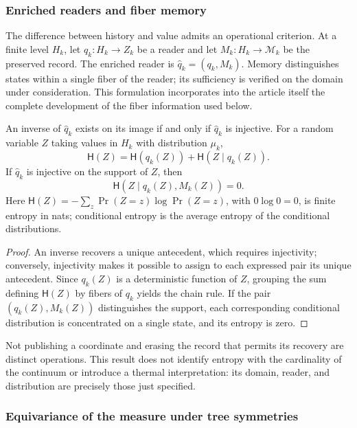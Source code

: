 \subsubsection{Enriched readers and fiber memory}
\label{act21:sec:ch-memoria-fibra}

The difference between history and value admits an operational criterion. At a
finite level \(H_k\), let \(q_k:H_k\to Z_k\) be a reader and let
\(M_k:H_k\to\mathcal M_k\) be the preserved record. The enriched reader
is \(\widehat q_k=(q_k,M_k)\). Memory distinguishes states within a single
fiber of the reader; its sufficiency is verified on the domain under consideration.
This formulation incorporates into the article itself the complete development of the
fiber information used below.

\begin{proposition}
\label{act21:prop:ch-recuperabilidad-fibra}
An inverse of \(\widehat q_k\) exists on its image if and only if
\(\widehat q_k\) is injective. For a random variable \(Z\) taking
values in \(H_k\) with distribution \(\mu_k\),
\[
 \mathsf H(Z)=\mathsf H(q_k(Z))+\mathsf H(Z\mid q_k(Z)).
\]
If \(\widehat q_k\) is injective on the support of \(Z\), then
\[
 \mathsf H(Z\mid q_k(Z),M_k(Z))=0.
\]
Here \(\mathsf H(Z)=-\sum_z\Pr(Z=z)\log\Pr(Z=z)\), with
\(0\log0=0\), is finite entropy in nats; conditional entropy is
the average entropy of the conditional distributions.
\end{proposition}

\begin{proof}
An inverse recovers a unique antecedent, which requires injectivity;
conversely, injectivity makes it possible to assign to each expressed pair its unique
antecedent. Since \(q_k(Z)\) is a deterministic function of \(Z\),
grouping the sum defining \(\mathsf H(Z)\) by fibers of \(q_k\) yields the
chain rule. If the pair \((q_k(Z),M_k(Z))\) distinguishes the support,
each corresponding conditional distribution is concentrated on a single
state, and its entropy is zero.
\end{proof}

Not publishing a coordinate and erasing the record that permits its recovery are
distinct operations. This result does not identify entropy with the cardinality
of the continuum or introduce a thermal interpretation: its domain, reader, and
distribution are precisely those just specified.

\subsubsection{Equivariance of the measure under tree symmetries}
\label{act21:sec:ch-naturalidad-medida}

